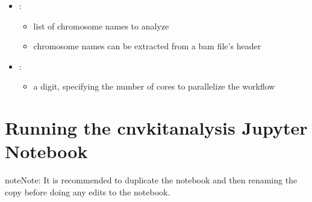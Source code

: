 \documentclass[letterpaper,10pt,english]{sphinxhowto}
\begin{document}
\begin{sphinxVerbatim}[commandchars=\\\{\}]
       
       
       
       
\end{sphinxVerbatim}
\begin{itemize}
\item {} 
\sphinxAtStartPar
{}:
\begin{itemize}
\item {} 
\sphinxAtStartPar
list of chromosome names to analyze

\item {} 
\sphinxAtStartPar
chromosome names can be extracted from a bam file’s header

\end{itemize}

\item {} 
\sphinxAtStartPar
{}:
\begin{itemize}
\item {} 
\sphinxAtStartPar
a digit, specifying the number of cores to parallelize the workflow

\end{itemize}

\end{itemize}


\section{Running the cnvkit\sphinxhyphen{}analysis Jupyter Notebook}
\label{\detokenize{index:running-the-cnvkit-analysis-jupyter-notebook}}
\begin{sphinxadmonition}{note}{Note:}
\sphinxAtStartPar
It is recommended to duplicate the  notebook and then renaming the copy before doing any edits to the notebook.
\end{sphinxadmonition}
\end{document}
